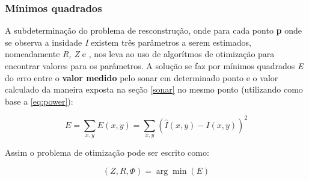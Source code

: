 \documentclass[a4paper,11pt,oneside,brazilian]{article}
\begin{document}
\subsubsection{Mínimos quadrados}

A subdeterminação do problema de resconstrução, onde para cada ponto \textbf{p}
onde se observa a insidade \emph{I} existem três parâmetros a serem estimados,
nomeadamente \emph{R, Z} e \textPhi , nos leva ao uso de algorítmos de
otimização para encontrar valores para os parâmetros. A solução se faz por
mínimos quadrados \emph{E} do erro entre o \textbf{valor medido} pelo sonar em
determinado ponto e o valor calculado da maneira exposta na seção \ref{sonar}
no mesmo ponto (utilizando como base a \eqref{eq:power}):

\[
E = \sum_{x,y}^{} E(x,y) = \sum_{x,y}^{} \left( \hat{I}(x,y) - I(x,y)\right)^2
\]

\begin{minipage}{\textwidth}
Assim o problema de otimização pode ser escrito como:

\[
(Z,R,\Phi) = \arg\min(E)
\]
\end{minipage}
\end{document}
